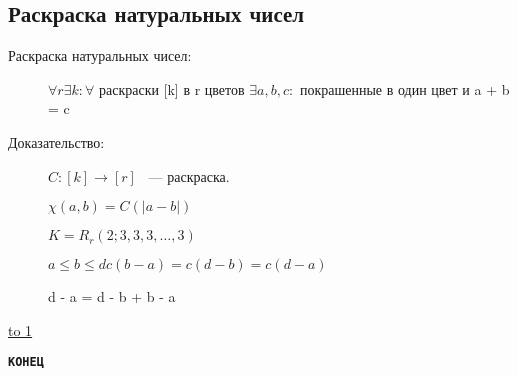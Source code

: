 \documentclass[12pt]{article}
\def\t{\texttt}
\begin{document}
\subsection{Раскраска натуральных чисел}
\begin{description}
\item[Раскраска натуральных чисел:] $\forall r \exists k: \forall $ раскраски [k] в r цветов $\exists a, b, c:$ покрашенные в один цвет и a + b = c
\item[Доказательство:]

$C:[k] \to [r]$ ~--- раскраска.

$\chi(a, b) = C(|a - b|)$

$K = R_r(2; 3, 3, 3, \ldots, 3)$


$a \le b \le d c(b - a) = c(d - b) = c(d - a)$

d - a = d - b + b - a

\end{description}
\noindent \underline{\hbox to 1\textwidth{{ } \hfil{ } \hfil{ } }}

\begin{center}
  \t{\Large{\bf КОНЕЦ}}
\end{center}
\end{document}
